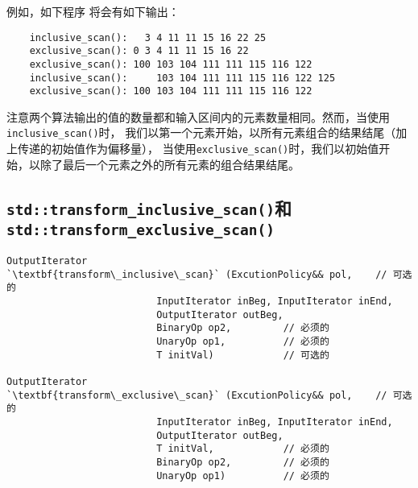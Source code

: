 例如，如下程序
将会有如下输出：
\begin{lstlisting}
    inclusive_scan():   3 4 11 11 15 16 22 25
    exclusive_scan(): 0 3 4 11 11 15 16 22
    exclusive_scan(): 100 103 104 111 111 115 116 122
    inclusive_scan():     103 104 111 111 115 116 122 125
    exclusive_scan(): 100 103 104 111 111 115 116 122
\end{lstlisting}
注意两个算法输出的值的数量都和输入区间内的元素数量相同。然而，当使用\texttt{inclusive\_scan()}时，
我们以第一个元素开始，以所有元素组合的结果结尾（加上传递的初始值作为偏移量），
当使用\texttt{exclusive\_scan()}时，我们以初始值开始，以除了最后一个元素之外的所有元素的组合结果结尾。

\subsection{\texorpdfstring{\texttt{std::transform\_inclusive\_scan()}和\\
\texttt{std::transform\_exclusive\_scan()}}{}}
\begin{lstlisting}[frame=single,xleftmargin=13pt,xrightmargin=13pt]
OutputIterator
`\textbf{transform\_inclusive\_scan}` (ExcutionPolicy&& pol,    // 可选的
                          InputIterator inBeg, InputIterator inEnd,
                          OutputIterator outBeg,
                          BinaryOp op2,         // 必须的
                          UnaryOp op1,          // 必须的
                          T initVal)            // 可选的

OutputIterator
`\textbf{transform\_exclusive\_scan}` (ExcutionPolicy&& pol,    // 可选的
                          InputIterator inBeg, InputIterator inEnd,
                          OutputIterator outBeg,
                          T initVal,            // 必须的
                          BinaryOp op2,         // 必须的
                          UnaryOp op1)          // 必须的
\end{lstlisting}
